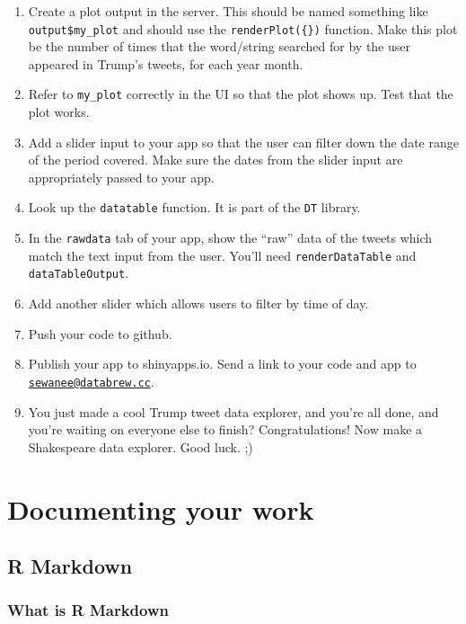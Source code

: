 \documentclass[
]{book}
\begin{document}
\begin{enumerate}
\def\labelenumi{\arabic{enumi}.}
\setcounter{enumi}{9}
\item
  Create a plot output in the server. This should be named something like \texttt{output\$my\_plot} and should use the \texttt{renderPlot(\{\})} function. Make this plot be the number of times that the word/string searched for by the user appeared in Trump's tweets, for each year month.
\item
  Refer to \texttt{my\_plot} correctly in the UI so that the plot shows up. Test that the plot works.
\item
  Add a slider input to your app so that the user can filter down the date range of the period covered. Make sure the dates from the slider input are appropriately passed to your app.
\item
  Look up the \texttt{datatable} function. It is part of the \texttt{DT} library.
\item
  In the \texttt{rawdata} tab of your app, show the ``raw'' data of the tweets which match the text input from the user. You'll need \texttt{renderDataTable} and \texttt{dataTableOutput}.
\item
  Add another slider which allows users to filter by time of day.
\item
  Push your code to github.
\item
  Publish your app to shinyapps.io. Send a link to your code and app to \href{mailto:sewanee@databrew.cc}{\nolinkurl{sewanee@databrew.cc}}.
\item
  You just made a cool Trump tweet data explorer, and you're all done, and you're waiting on everyone else to finish? Congratulations! Now make a Shakespeare data explorer. Good luck. ;)
\end{enumerate}

\hypertarget{part-documenting-your-work}{%
\part{Documenting your work}\label{part-documenting-your-work}}

\hypertarget{rmarkdown}{%
\chapter{R Markdown}\label{rmarkdown}}

\hypertarget{what-is-r-markdown}{%
\section*{What is R Markdown}\label{what-is-r-markdown}}
\end{document}

